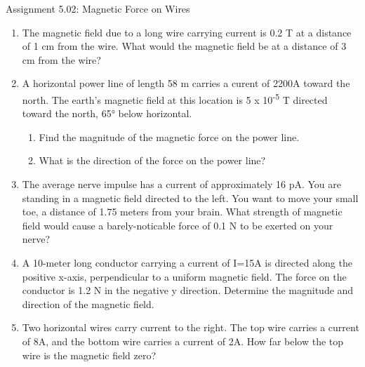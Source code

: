\documentclass[letterpaper, 12pt]{article}
\begin{document}
	

	
\begin{center}Assignment 5.02: Magnetic Force on Wires
\end{center}

\begin{enumerate}




	\item The magnetic field due to a long wire carrying current is 0.2 T at a distance of 1 cm from the wire. What would the magnetic field be at a distance of 3 cm from the wire?
	\vspace{1in}
	\item A horizontal power line of length 58 m carries a curent of 2200A toward the north.  The earth's magnetic field at this location is 5 x 10\textsuperscript{-5} T directed toward the north, 65° below horizontal. 
	\begin{enumerate}
		\item Find the magnitude of the magnetic force on the power line.
		\vspace{.8in}
		\item What is the direction of the force on the power line?
		\vspace{.8in}
	\end{enumerate}

	\item The average nerve impulse has a current of approximately 16 pA.  You are standing in a magnetic field directed to the left.  You want to move your small toe, a distance of 1.75 meters from your brain. What strength of magnetic field would cause a barely-noticable force of 0.1 N to be exerted on your nerve?  
	
	\vspace{.9in}
	
	\item A 10-meter long conductor carrying a current of I=15A is directed along the positive x-axis, perpendicular to a uniform magnetic field.  The force on the conductor is 1.2 N in the negative y direction.  Determine the magnitude and direction of the magnetic field. 
	\vspace{1.25in}
	
	\item Two horizontal wires carry current to the right.  The top wire carries a current of 8A, and the bottom wire carries a current of 2A.  How far below the top wire is the magnetic field zero?
	

\end{enumerate}
\end{document}
